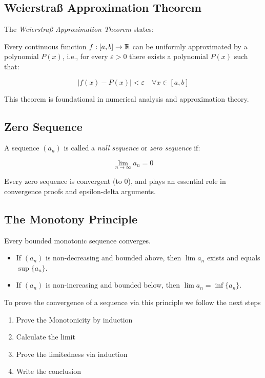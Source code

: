 \subsection{Weierstraß Approximation Theorem}

The \emph{Weierstraß Approximation Theorem} states:

Every continuous function \(f: [a, b] \rightarrow \mathbb{R}\) can be uniformly approximated by a 
polynomial \(P(x)\), i.e., for every \(\varepsilon > 0\) there exists a polynomial \(P(x)\) such that:

\[
    |f(x) - P(x)| < \varepsilon \quad \forall x \in [a, b]
\]

This theorem is foundational in numerical analysis and approximation theory.

\subsection{Zero Sequence}

A sequence \((a_n)\) is called a \emph{null sequence} or \emph{zero sequence} if:

\[
    \lim_{n \to \infty} a_n = 0
\]

Every zero sequence is convergent (to 0), and plays an essential role in convergence proofs and 
epsilon-delta arguments.

\subsection{The Monotony Principle}

Every bounded monotonic sequence converges.

\begin{itemize}

    \item If \((a_n)\) is non-decreasing and bounded above, then \(\lim a_n\) exists and equals 
    \(\sup \{a_n\}\).

    \item If \((a_n)\) is non-increasing and bounded below, then \(\lim a_n = \inf \{a_n\}\).

\end{itemize}

To prove the convergence of a sequence via this principle we follow the next steps

\begin{enumerate}

    \item Prove the Monotonicity by induction

    \item Calculate the limit

    \item Prove the limitedness via induction

    \item Write the conclusion

\end{enumerate}


